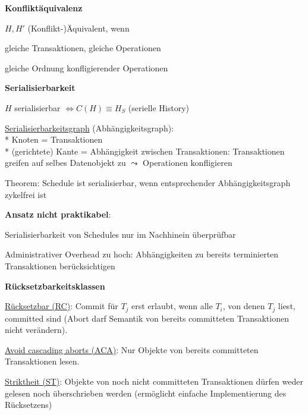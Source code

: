 \textbf{Konfliktäquivalenz}
\begin{items}
	\item \( H, H' \) (Konflikt-)Äquivalent, wenn
	\begin{enumeration}
		\item gleiche Transaktionen, gleiche Operationen
		\item gleiche Ordnung konfligierender Operationen
	\end{enumeration}
\end{items}

\textbf{Serialisierbarkeit}
\begin{items}
	\item \( H \) serialisierbar \( \Leftrightarrow C(H) \equiv H_S \) (serielle History)
	\item \underline{Serialisierbarkeitsgraph} (Abhängigkeitsgraph):
		\\*
		Knoten = Transaktionen
		\\*
		(gerichtete) Kante = Abhängigkeit zwischen Transaktionen: Transaktionen greifen auf selbes Datenobjekt zu \( \leadsto \) Operationen konfligieren
	\item Theorem: Schedule ist serialisierbar, wenn entsprechender Abhängigkeitsgraph zykelfrei ist
	\item \textbf{Ansatz nicht praktikabel}:
	\begin{enumeration}
		\item Serialisierbarkeit von Schedules nur im Nachhinein überprüfbar
		\item Administrativer Overhead zu hoch: Abhängigkeiten zu bereits terminierten Transaktionen berücksichtigen
	\end{enumeration}
\end{items}

\textbf{Rücksetzbarkeitsklassen}
\begin{items}
	\item \underline{Rücksetzbar (RC)}: Commit für $T_j$ erst erlaubt, wenn alle $T_i$, von denen $T_j$ liest, committed sind (Abort darf Semantik von bereits committeten Transaktionen nicht verändern).
	\item \underline{Avoid cascading aborts (ACA)}: Nur Objekte von bereits committeten Transaktionen lesen.
	\item \underline{Striktheit (ST)}: Objekte von noch nicht committeten Transaktionen dürfen weder gelesen noch überschrieben werden (ermöglicht einfache Implementierung des Rücksetzens)
\end{items}

